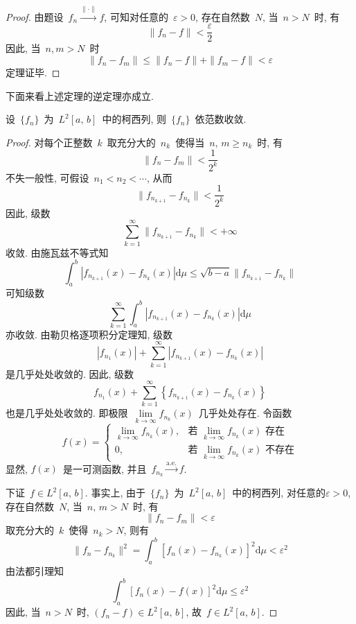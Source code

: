 \begin{proof}
由题设~$f_{n}\xrightarrow{\mathrm{\|\cdot\|}} f$, 可知对任意的~$\varepsilon>0$, 存在自然数~$N$, 当~$n>N$~时, 有
\[
\|f_{n}-f\|<\frac{\varepsilon}{2}
\]
因此, 当~$n,m>N$~时
\[
\|f_{n}-f_{m}\|\leqslant \|f_{n}-f\|+\|f_{m}-f\|<\varepsilon
\]
定理证毕.
\end{proof}

下面来看上述定理的逆定理亦成立.

\begin{Theorem}\label{Fischer}
设~$\{f_n\}$~为~$L^2[a,\,b]$~中的柯西列, 则~$\{f_n\}$~依范数收敛.
\end{Theorem}

\begin{proof}
对每个正整数~$k$~取充分大的~$n_{k}$~使得当~$n,\,m\geqslant n_k$~时, 有
\[
\|f_n-f_m\|<\frac{1}{2^{k}}
\]
不失一般性, 可假设~$n_1<n_2<\cdots$, 从而
\[
\|f_{n_{k+1}}-f_{n_{k}}\|<\frac{1}{2^{k}}
\]
因此, 级数
\[
\sum_{k=1}^{\infty}\|f_{n_{k+1}}-f_{n_{k}}\|<+\infty
\]
收敛. 由施瓦兹不等式知
\[
\int_{a}^{b}\left|f_{n_{k+1}}(x)-f_{n_{k}}(x)\right|\mathrm{d}\mu\leqslant \sqrt{b-a}\|f_{n_{k+1}}-f_{n_{k}}\|
\]
可知级数
\[
\sum_{k=1}^{\infty}\int_{a}^{b}\left|f_{n_{k+1}}(x)-f_{n_{k}}(x)\right|\mathrm{d}\mu
\]
亦收敛. 由勒贝格逐项积分定理知, 级数
\[
|f_{n_{1}}(x)|+\sum_{k=1}^{\infty}\left|f_{n_{k+1}}(x)-f_{n_{k}}(x)\right|
\]
是几乎处处收敛的. 因此, 级数
\[
f_{n_{1}}(x)+\sum_{k=1}^{\infty}\left\{f_{n_{k+1}}(x)-f_{n_{k}}(x)\right\}
\]
也是几乎处处收敛的. 即极限~$\lim\limits_{k\rightarrow\infty}f_{n_{k}}(x)$~几乎处处存在. 令函数
\[
f(x) = \left\{ \!\!
\begin{array}{cl}
\lim\limits_{k\rightarrow\infty}f_{n_{k}}(x), & \mbox{若~}\lim\limits_{k\rightarrow\infty}f_{n_{k}}(x) \mbox{~存在}  \\[0.2cm]
0, & \mbox{若~}\lim\limits_{k\rightarrow\infty}f_{n_{k}}(x) \mbox{~不存在}
\end{array}
\right.
\]
显然, $f(x)$~是一可测函数, 并且~$f_{n_{k}} \xrightarrow{\mathrm{a.e.}} f$.

下证~$f\in L^2[a,\,b]$. 事实上, 由于~$\{f_n\}$~为~$L^2[a,\,b]$~中的柯西列, 对任意的$\varepsilon>0$, 存在自然数~$N$, 当~$n,\,m>N$~时, 有
\[
\|f_{n}-f_{m}\|<\varepsilon
\]
取充分大的~$k$~使得~$n_k>N$, 则有
\[
\|f_{n}-f_{n_k}\|^{2}=\int_{a}^{b}\left[f_{n}(x)-f_{n_{k}}(x)\right]^{2}\mathrm{d}\mu<\varepsilon^{2}
\]
由法都引理知
\[
\int_{a}^{b}\left[f_{n}(x)-f(x)\right]^{2}\mathrm{d}\mu\leqslant \varepsilon^{2}
\]
因此, 当~$n>N$~时, $(f_{n}-f)\in L^2[a,\,b]$, 故~$f\in L^2[a,\,b]$.
\end{proof}

